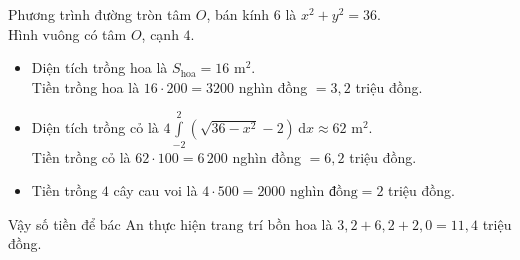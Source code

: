 \begin{ex}
{\begin{center}
\end{center}
Phương trình đường tròn tâm $O$, bán kính $6$ là
$x^2+y^2=36$.\\
Hình vuông có tâm $O$, cạnh $4$.
\begin{itemize}
\item Diện tích trồng hoa là $S_{\text{hoa}}=16$ m$^2$.\\
Tiền trồng hoa là $16\cdot 200=3200$ nghìn đồng $=3{,}2$  triệu đồng.
\item Diện tích trồng cỏ là $4\displaystyle\int\limits_{-2}^2\left(\sqrt{36-x^2}-2\right)\mathrm{\,d}x\approx 62$ m$^2$.\\
Tiền trồng cỏ là $62\cdot 100=6\,200$ nghìn đồng $=6{,}2$ triệu đồng.
\item Tiền trồng $4$ cây cau voi là $
4\cdot 500=2000 \text{ nghìn đồng}=2$ triệu đồng.
\end{itemize}
Vậy số tiền để bác An thực hiện trang trí bồn hoa là
$3{,}2+6{,}2+2{,}0=11{,}4$ triệu đồng.
}
\end{ex}

